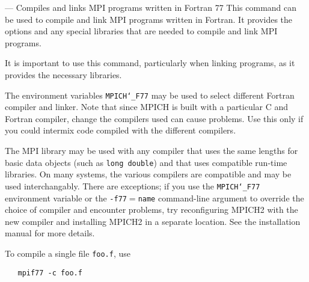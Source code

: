 \startmanpage
{}
--- Compiles and links MPI programs written in Fortran 77 
This command can be used to compile and link MPI programs written in
Fortran.  It provides the options and any special libraries that are
needed to compile and link MPI programs.
\par
It is important to use this command, particularly when linking programs,
as it provides the necessary libraries.
\par
{}
\par
{}
The environment variables {\tt MPICH{\tt \char`\_}F77} may be used
to select different Fortran compiler and linker.  Note that since
MPICH is built with a particular C and Fortran compiler, change the
compilers used can cause problems.  Use this only if you could intermix
code compiled with the different compilers.
\par
{}
The MPI library may be used with any compiler that uses the same
lengths for basic data objects (such as {\tt long double}) and that
uses compatible run-time libraries.  On many systems, the various
compilers are compatible and may be used interchangably.  There are
exceptions; if you use the {\tt MPICH{\tt \char`\_}F77} environment variable or the
{\tt -f77$=$name} command-line argument to override the choice of compiler
and encounter problems, try reconfiguring MPICH2 with the new compiler
and installing MPICH2 in a separate location.  See the installation manual
for more details.
\par
{}
To compile a single file {\tt foo.f}, use
\begin{verbatim}
   mpif77 -c foo.f 
\end{verbatim}

